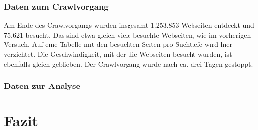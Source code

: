 \subsection{Daten zum Crawlvorgang}
Am Ende des Crawlvorgangs wurden insgesamt 1.253.853 Webseiten entdeckt und 75.621 besucht. Das sind etwa gleich viele besuchte Webseiten, wie im vorherigen Versuch. Auf eine Tabelle mit den besuchten Seiten pro Suchtiefe wird hier verzichtet. Die Geschwindigkeit, mit der die Webseiten besucht wurden, ist ebenfalls gleich geblieben. Der Crawlvorgang wurde nach ca. drei Tagen gestoppt.
\subsection{Daten zur Analyse}


\chapter{Fazit}
